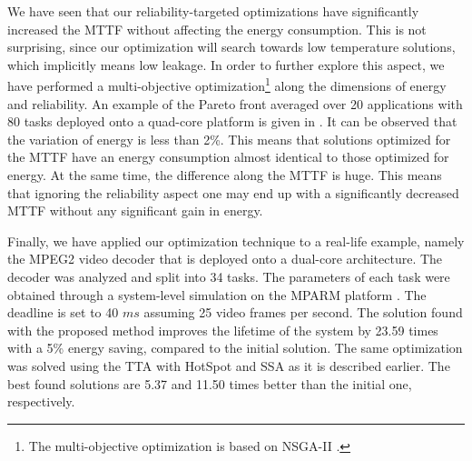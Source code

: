 We have seen that our reliability-targeted optimizations have significantly increased the MTTF without affecting the energy consumption. This is not surprising, since our optimization will search towards low temperature solutions, which implicitly means low leakage. In order to further explore this aspect, we have performed a multi-objective optimization\footnote{The multi-objective optimization is based on NSGA-II \cite{deb2002}.} along the dimensions of energy and reliability. An example of the Pareto front averaged over 20 applications with 80 tasks deployed onto a quad-core platform is given in . It can be observed that the variation of energy is less than 2\%. This means that solutions optimized for the MTTF have an energy consumption almost identical to those optimized for energy. At the same time, the difference along the MTTF is huge. This means that ignoring the reliability aspect one may end up with a significantly decreased MTTF without any significant gain in energy.

Finally, we have applied our optimization technique to a real-life example, namely the MPEG2 video decoder \cite{ffmpeg2011} that is deployed onto a dual-core architecture. The decoder was analyzed and split into 34 tasks. The parameters of each task were obtained through a system-level simulation on the MPARM platform \cite{benini2005}. The deadline is set to 40 $ms$ assuming 25 video frames per second. The solution found with the proposed method improves the lifetime of the system by 23.59 times with a 5\% energy saving, compared to the initial solution. The same optimization was solved using the TTA with HotSpot and SSA as it is described earlier. The best found solutions are 5.37 and 11.50 times better than the initial one, respectively.
